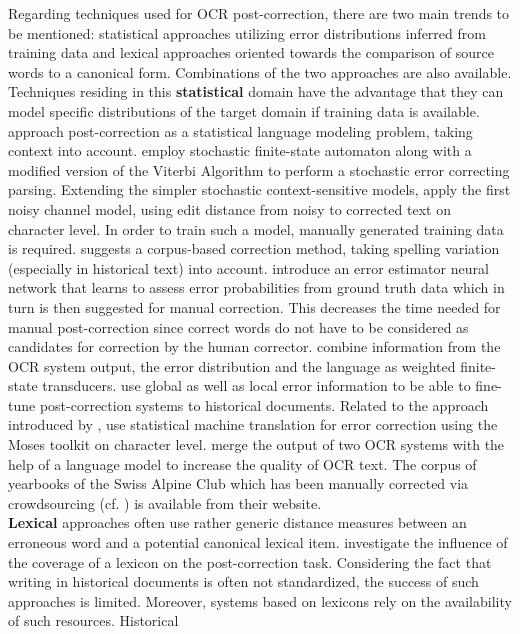 \documentclass[11pt,letterpaper]{article}
\begin{document}
Regarding techniques used for OCR post-correction, there are two main trends to be mentioned: statistical approaches utilizing error distributions inferred from training data and lexical approaches oriented towards the comparison of source words to a canonical form. Combinations of the two approaches are also available.\\
Techniques residing in this \textbf{statistical} domain have the advantage that they can model specific distributions of the target domain if training data is available.
 approach post-correction as a statistical language modeling problem, taking context into account.
 employ stochastic finite-state automaton along with a modified version of the Viterbi Algorithm to perform a stochastic error correcting parsing.
Extending the simpler stochastic context-sensitive models,  apply the first
noisy channel model, using edit distance from noisy to corrected text on character level. In order to 
train such a model, manually generated training data is required. 
 suggests a corpus-based correction method, taking spelling variation (especially in historical text) into account.
 introduce an error estimator neural network that learns to assess error probabilities from ground truth data which in turn is then suggested for manual correction. This decreases the time needed for manual post-correction since correct words do not have to be considered as candidates for correction by the human corrector.
 combine information from the OCR system output, the error distribution and the language as weighted finite-state transducers.
 use global as well as local error information to be able to fine-tune post-correction systems to historical documents.
Related to the approach introduced by ,  use statistical machine translation for error correction using the Moses toolkit on character level.
 merge the output of two OCR systems with the help of a language model to increase the quality of OCR text. The corpus of yearbooks of the Swiss Alpine Club which has been manually corrected via crowdsourcing (cf. ) is available from their website.\\
\textbf{Lexical} approaches often use rather generic distance measures between an erroneous word and a potential canonical lexical item.  investigate the influence of the coverage of a lexicon on the post-correction task. Considering the fact that writing in historical documents is often not standardized, the success of such approaches is limited. Moreover, systems based on lexicons rely on the availability of such resources. Historical
\end{document}

